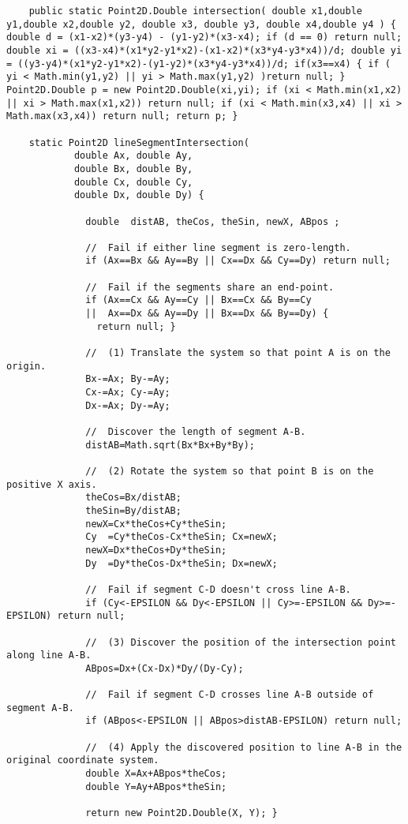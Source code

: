 \documentclass[a4paper, 11pt, oneside]{report}
\begin{document}
\begin{verbatim}
	public static Point2D.Double intersection( double x1,double y1,double x2,double y2, double x3, double y3, double x4,double y4 ) { double d = (x1-x2)*(y3-y4) - (y1-y2)*(x3-x4); if (d == 0) return null; double xi = ((x3-x4)*(x1*y2-y1*x2)-(x1-x2)*(x3*y4-y3*x4))/d; double yi = ((y3-y4)*(x1*y2-y1*x2)-(y1-y2)*(x3*y4-y3*x4))/d; if(x3==x4) { if ( yi < Math.min(y1,y2) || yi > Math.max(y1,y2) )return null; } Point2D.Double p = new Point2D.Double(xi,yi); if (xi < Math.min(x1,x2) || xi > Math.max(x1,x2)) return null; if (xi < Math.min(x3,x4) || xi > Math.max(x3,x4)) return null; return p; }
	
	static Point2D lineSegmentIntersection(
			double Ax, double Ay,
			double Bx, double By,
			double Cx, double Cy,
			double Dx, double Dy) {

			  double  distAB, theCos, theSin, newX, ABpos ;

			  //  Fail if either line segment is zero-length.
			  if (Ax==Bx && Ay==By || Cx==Dx && Cy==Dy) return null;

			  //  Fail if the segments share an end-point.
			  if (Ax==Cx && Ay==Cy || Bx==Cx && By==Cy
			  ||  Ax==Dx && Ay==Dy || Bx==Dx && By==Dy) {
			    return null; }

			  //  (1) Translate the system so that point A is on the origin.
			  Bx-=Ax; By-=Ay;
			  Cx-=Ax; Cy-=Ay;
			  Dx-=Ax; Dy-=Ay;

			  //  Discover the length of segment A-B.
			  distAB=Math.sqrt(Bx*Bx+By*By);

			  //  (2) Rotate the system so that point B is on the positive X axis.
			  theCos=Bx/distAB;
			  theSin=By/distAB;
			  newX=Cx*theCos+Cy*theSin;
			  Cy  =Cy*theCos-Cx*theSin; Cx=newX;
			  newX=Dx*theCos+Dy*theSin;
			  Dy  =Dy*theCos-Dx*theSin; Dx=newX;

			  //  Fail if segment C-D doesn't cross line A-B.
			  if (Cy<-EPSILON && Dy<-EPSILON || Cy>=-EPSILON && Dy>=-EPSILON) return null;

			  //  (3) Discover the position of the intersection point along line A-B.
			  ABpos=Dx+(Cx-Dx)*Dy/(Dy-Cy);

			  //  Fail if segment C-D crosses line A-B outside of segment A-B.
			  if (ABpos<-EPSILON || ABpos>distAB-EPSILON) return null;

			  //  (4) Apply the discovered position to line A-B in the original coordinate system.
			  double X=Ax+ABpos*theCos;
			  double Y=Ay+ABpos*theSin;

			  return new Point2D.Double(X, Y); }
	

\end{verbatim}
\end{document}
